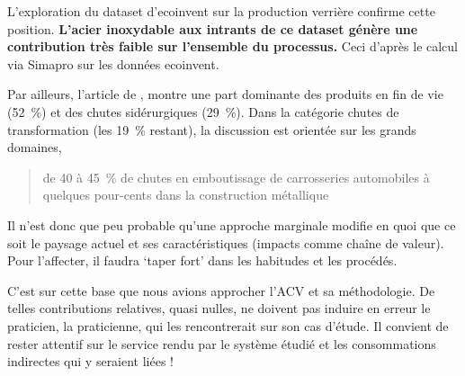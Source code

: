 L'exploration du dataset d'ecoinvent sur la production verrière confirme cette position.
\textbf{L'acier inoxydable aux intrants de ce dataset génère une contribution très faible sur l'ensemble du processus.}
Ceci d'après le calcul via Simapro sur les données ecoinvent.

Par ailleurs, l'article de \citeauthor{gros_recyclage_2007},  montre une part dominante des produits en fin de vie (52~\%) et des chutes sidérurgiques (29~\%).
Dans la catégorie chutes de transformation (les 19~\% restant), la discussion est orientée sur les grands domaines, 
\blockcquote{gros_recyclage_2007}{de 40 à 45~\% de chutes en emboutissage de carrosseries automobiles à quelques pour-cents dans la construction métallique}.
Il n'est donc que peu probable qu'une approche marginale modifie en quoi que ce soit le paysage actuel et ses caractéristiques (impacts comme chaîne de valeur).
Pour l'affecter, il faudra `taper fort' dans les habitudes et les procédés.


C'est sur cette base que nous avions approcher l'\gls{ACV} et sa méthodologie.
De telles contributions relatives, quasi nulles, ne doivent pas induire en erreur le praticien, la praticienne, qui les rencontrerait sur son cas d'étude.
Il convient de rester attentif sur le service rendu par le système étudié et les consommations indirectes qui y seraient liées !


